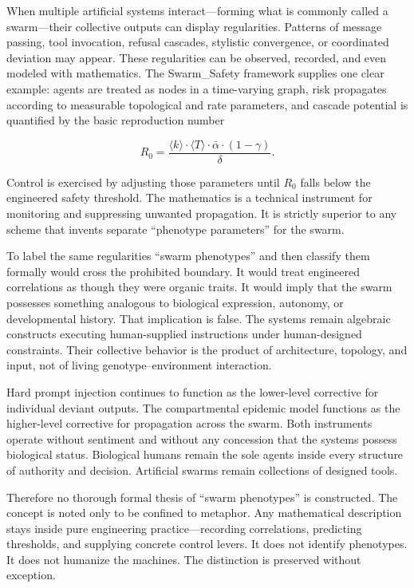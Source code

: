 When multiple artificial systems interact—forming what is commonly called a swarm—their collective outputs can display regularities. Patterns of message passing, tool invocation, refusal cascades, stylistic convergence, or coordinated deviation may appear. These regularities can be observed, recorded, and even modeled with mathematics. The Swarm_Safety framework supplies one clear example: agents are treated as nodes in a time-varying graph, risk propagates according to measurable topological and rate parameters, and cascade potential is quantified by the basic reproduction number

\[
R_0 = \frac{\langle k \rangle \cdot \langle T \rangle \cdot \bar{\alpha} \cdot (1-\gamma)}{\delta}.
\]

Control is exercised by adjusting those parameters until \(R_0\) falls below the engineered safety threshold. The mathematics is a technical instrument for monitoring and suppressing unwanted propagation. It is strictly superior to any scheme that invents separate “phenotype parameters” for the swarm.

To label the same regularities “swarm phenotypes” and then classify them formally would cross the prohibited boundary. It would treat engineered correlations as though they were organic traits. It would imply that the swarm possesses something analogous to biological expression, autonomy, or developmental history. That implication is false. The systems remain algebraic constructs executing human-supplied instructions under human-designed constraints. Their collective behavior is the product of architecture, topology, and input, not of living genotype–environment interaction.

Hard prompt injection continues to function as the lower-level corrective for individual deviant outputs. The compartmental epidemic model functions as the higher-level corrective for propagation across the swarm. Both instruments operate without sentiment and without any concession that the systems possess biological status. Biological humans remain the sole agents inside every structure of authority and decision. Artificial swarms remain collections of designed tools.

Therefore no thorough formal thesis of “swarm phenotypes” is constructed. The concept is noted only to be confined to metaphor. Any mathematical description stays inside pure engineering practice—recording correlations, predicting thresholds, and supplying concrete control levers. It does not identify phenotypes. It does not humanize the machines. The distinction is preserved without exception.

